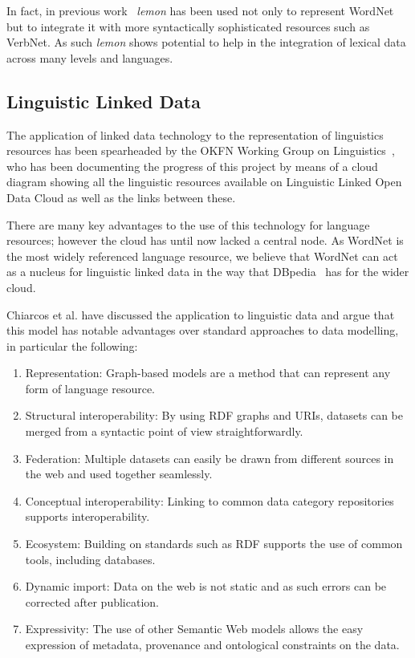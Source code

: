 \documentclass[10pt, a4paper]{article}
\newcommand{\lemon}[0]{\emph{lemon}}
\begin{document}
In fact, in previous work~\cite{eckle2014lemonuby} \lemon{} has been used not only to
represent WordNet but to integrate it with more syntactically sophisticated
resources such as VerbNet. As such \lemon{} shows potential to help in the
integration of lexical data across many levels and languages.

\subsection{Linguistic Linked Data}

The application of linked data technology to the representation of linguistics
resources has been spearheaded by the OKFN Working Group on Linguistics~\cite{chiarcos2011towards},
who has been documenting the progress of this project by means of a cloud
diagram showing all the linguistic resources available on Linguistic Linked Open Data Cloud as well as the links between these.

There are many key advantages to the use
of this technology for language resources; however the cloud has until now
lacked a central node. As WordNet is the most widely referenced language
resource, we believe that WordNet can act as a nucleus for linguistic linked data
in the way that DBpedia~\cite{auer2007dbpedia} has for the wider cloud.

Chiarcos et al. \cite{chiarcos2013towards} have discussed the
application to linguistic data and argue that this model has notable
advantages over standard approaches to data modelling, in particular the following:

\begin{enumerate}
    \item Representation: Graph-based models are a method that can represent any
        form of language resource.
    \item Structural interoperability: By using RDF graphs and URIs, datasets can
        be merged from a syntactic point of view straightforwardly.
    \item Federation: Multiple datasets can easily be drawn from different
        sources in the web and used together seamlessly.
    \item Conceptual interoperability: Linking to common data category
        repositories supports interoperability.
        \item Ecosystem: Building on standards such as RDF supports the use of common
        tools, including databases.
    \item Dynamic import: Data on the web is not static and as such errors can
        be corrected after publication.
    \item Expressivity: The use of other Semantic Web models allows the easy
        expression of metadata, provenance and ontological constraints on the
        data.
\end{enumerate}
\end{document}
